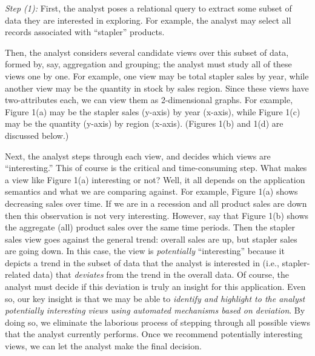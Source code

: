 \documentclass{sig-alternate}
\begin{document}
\noindent 
{\em Step (1):} First, the analyst poses a relational query 
to extract some subset of data they are interested in exploring.
For example, the analyst may select all records associated with
``stapler'' products.





 Then, the analyst considers several candidate views 
over this subset of data, formed by, say, aggregation and grouping;
the analyst must study all of these views one by one.
For example, one view may be total stapler sales by year,
while another view may be the quantity in stock by sales region.
Since these views have two-attributes each, we can view them
as 2-dimensional graphs. 
For example, Figure 1(a) may be the stapler sales (y-axis) by year (x-axis),
while Figure 1(c) may be the quantity (y-axis) by region (x-axis).
(Figures 1(b) and 1(d) are discussed below.)




 Next, the analyst steps 
through each view, and decides which views are ``interesting.''
This of course is the critical and time-consu\-ming step.
What makes a view like Figure 1(a) interesting or not?
Well, it all depends on the application semantics
and what we are comparing against.
For example, Figure 1(a) shows decreasing sales over time.
If we are in a recession and all product sales are down then this observation
is not very interesting. However, say that Figure 1(b) shows
the aggregate (all) product sales over the same time periods.
Then the stapler sales view goes against the general trend: 
overall sales are up, but stapler sales are going down.
In this case, the view is {\em potentially} ``interesting''
because it depicts a trend in the subset of data
that the analyst is interested in (i.e., stapler-related data)
that {\em deviates} from the trend in the overall data.
Of course, the analyst must decide if this deviation 
is truly an insight for this application.
Even so, our key insight is that we may be able to 
{\em identify and highlight to the analyst potentially interesting views 
using automated mechanisms based on deviation}.
By doing so, we eliminate the laborious process
of stepping through all possible views that the analyst currently 
performs.
Once we recommend potentially interesting views, we can let the analyst
make the final decision.

\end{document}
